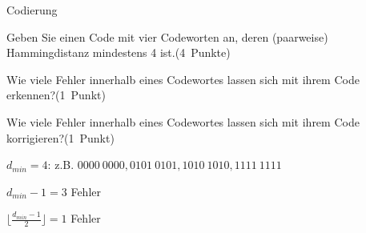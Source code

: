 \documentclass{exercisesheet}
\begin{document}
\begin{exercises}{Codierung}
\item Geben Sie einen Code mit vier Codeworten an, deren (paarweise) Hammingdistanz mindestens 4 ist.\hfill(4~Punkte)
\item Wie viele Fehler innerhalb eines Codewortes lassen sich mit ihrem Code erkennen?\hfill(1~Punkt)
\item Wie viele Fehler innerhalb eines Codewortes lassen sich mit ihrem Code korrigieren?\hfill(1~Punkt)
\end{exercises}

\begin{solutions}
  \item $d_{min}=4$: z.B. $0000\ 0000, 0101\ 0101, 1010\ 1010, 1111\ 1111$
  \item $d_{min}-1=3$ Fehler
  \item $\lfloor\frac{d_{min}-1}{2}\rfloor=1$ Fehler
\end{solutions}
\end{document}
